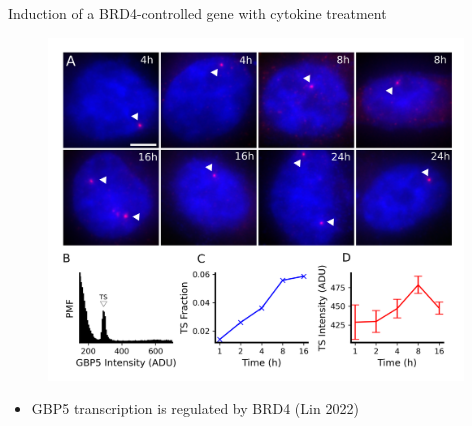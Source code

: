 \documentclass{beamer}					%
\begin{document}
\begin{frame}{Induction of a BRD4-controlled gene with cytokine treatment}
\begin{figure}
\includegraphics[width=11cm]{Figure-2.png}
\end{figure}
\begin{itemize}
\item GBP5 transcription is regulated by BRD4 (Lin 2022)
\end{itemize}
\end{frame}
\end{document}
